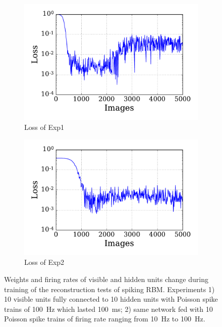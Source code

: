 \begin{figure}
\begin{subfigure}[t]{0.48\textwidth}
		\DIFaddendFL \includegraphics[width=\textwidth]{pics_sdlm/10_exp_SRBM_Orig/exp1_mse_nons.pdf}
		\caption{Loss of Exp1}
	\end{subfigure}
	\DIFdelbeginFL %
\DIFdelendFL \DIFaddbeginFL \begin{subfigure}[t]{0.48\textwidth}
		\DIFaddendFL \includegraphics[width=\textwidth]{pics_sdlm/10_exp_SRBM_Orig/exp2_mse_nons.pdf}
		\caption{Loss of Exp2}
	\end{subfigure}
	\caption{Weights and firing rates of visible and hidden units change during training of the reconstruction tests of \DIFaddbeginFL {}\DIFaddendFL spiking RBM. 
		Experiments 1) 10 visible units fully connected to 10 hidden units with Poisson spike trains of 100~Hz which lasted 100~ms; 2) \DIFaddbeginFL {}\DIFaddendFL same network fed with 10 Poisson spike trains of firing rate ranging from 10~Hz to 100~Hz.}
\label{fig:srbm_orig}
\end{figure}

